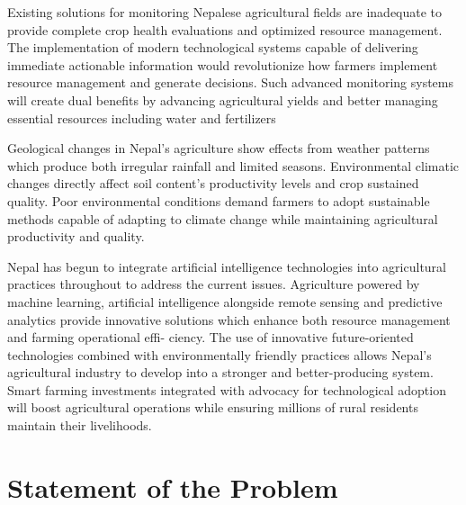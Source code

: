 Existing solutions for monitoring Nepalese agricultural fields are inadequate to provide complete crop health evaluations and optimized resource management. The implementation of 
modern technological systems capable of delivering immediate actionable information would revolutionize how farmers implement resource management and generate decisions. Such advanced monitoring systems will create dual benefits by advancing agricultural yields and better managing essential resources including water and fertilizers

Geological changes in Nepal’s agriculture show effects from weather patterns which produce both irregular rainfall and limited seasons. Environmental climatic changes directly
affect soil content's productivity levels and crop sustained quality. Poor environmental conditions demand farmers to adopt sustainable methods capable of adapting to climate
change while maintaining agricultural productivity and quality.

Nepal has begun to integrate artificial intelligence technologies into agricultural practices throughout to address the current issues. Agriculture powered by machine learning,
artificial intelligence alongside remote sensing and predictive analytics provide innovative solutions which enhance both resource management and farming operational effi-
ciency. The use of innovative future-oriented technologies combined with environmentally friendly practices allows Nepal's agricultural industry to develop
into a stronger and better-producing system. Smart farming investments integrated with advocacy for technological adoption will boost agricultural operations while ensuring millions
of rural residents maintain their livelihoods.




\section{Statement of the Problem}

